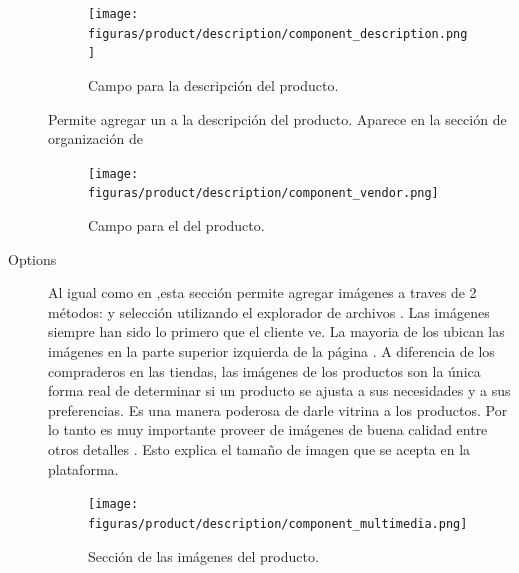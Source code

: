 \begin{description}
				\begin{figure}[H]
					\centering
					\texttt{[image: figuras/product/description/component\_description.png]}

					\caption{Campo para la descripción del producto.}
					\label{figure:product:description:component_description}
				\end{figure}

			\item [\vendorForm]
				Permite agregar un \vendorForm a la descripción del producto. Aparece en la sección de organización de \shopifyNAME {}

				\begin{figure}[H]
					\centering
					\texttt{[image: figuras/product/description/component\_vendor.png]}

					\caption{Campo para el \vendorForm del producto.}
					\label{figure:product:description:component_vendor}
				\end{figure}

			\item [Options]
				
			\item [\multimediaForm]
				Al igual como en \shopifyNAME {},esta sección permite agregar imágenes a traves de 2 métodos: \dragdrop y selección utilizando el explorador de archivos .
				Las imágenes siempre han sido lo primero que el cliente ve. La mayoria de los \websiteINT ubican las imágenes en la parte superior izquierda de la página \cite{online_cxpartners_official_people_see_to_buy}.
				A diferencia de los compraderos en las tiendas, las imágenes de los productos son la única forma real de determinar si un producto se ajusta a sus necesidades y a sus preferencias. Es una manera poderosa de darle vitrina a los productos. Por lo tanto es muy importante proveer de imágenes de buena calidad entre otros detalles \cite{online_cxpartners_official_people_see_to_buy}. Esto explica el tamaño de imagen que se acepta en la plataforma.

				\begin{figure}[H]
					\centering
					\texttt{[image: figuras/product/description/component\_multimedia.png]}

					\caption{Sección de las imágenes del producto.}
					\label{figure:product:description:component_multimedia}
				\end{figure}
				

\end{description}
